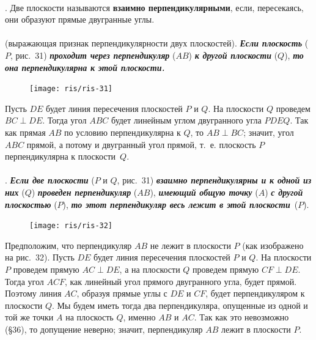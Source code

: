 \documentclass[twoside]{book}
\begin{document}
\paragraph{}\label{1938/s42}
.
Две плоскости называются \textbf{взаимно перпендикулярными}, если, пересекаясь, они образуют прямые двугранные углы.

\paragraph{}\label{1938/s43}  (выражающая признак перпендикулярности двух плоскостей).
\textbf{\emph{Если плоскость}} ($P$, рис.~31) \textbf{\emph{проходит через перпендикуляр}} ($AB$) \textbf{\emph{к другой плоскости}} ($Q$), \textbf{\emph{то она перпендикулярна к этой плоскости.}}

\begin{figure}[h!]
\centering
\texttt{[image: ris/ris-31]}
\caption{}
\end{figure}

Пусть $DE$ будет линия пересечения плоскостей $P$ и $Q$.
На плоскости $Q$ проведем $BC \perp DE$.
Тогда угол $ABC$ будет линейным углом двугранного угла $PDEQ$.
Так как прямая $AB$ по условию перпендикулярна к $Q$, то $AB\perp BC$;
значит, угол $ABC$ прямой, а потому и двугранный угол прямой, т.~е. плоскость $P$ перпендикулярна к плоскости~$Q$.

\paragraph{}\label{1938/s44}
.
\textbf{\emph{Если две плоскости}} ($P$ и $Q$, рис.~31) \textbf{\emph{взаимно перпендикулярны и к одной из них}} ($Q$) \textbf{\emph{проведен перпендикуляр}} ($AB$), \textbf{\emph{имеющий общую точку}} ($A$) \textbf{\emph{с другой плоскостью}} ($P$), \textbf{\emph{то этот перпендикуляр весь лежит в этой плоскости}}~($P$).

\begin{figure}[h!]
\centering
\texttt{[image: ris/ris-32]}
\caption{}
\end{figure}

Предположим, что перпендикуляр $AB$ не лежит в плоскости $P$ (как изображено на рис.~32).
Пусть $DE$ будет линия пересечения плоскостей $P$ и $Q$.
На плоскости $P$ проведем прямую $AC \perp DE$, а на плоскости $Q$ проведем прямую $CF \perp DE$.
Тогда угол $ACF$, как линейный угол прямого двугранного угла, будет прямой.
Поэтому линия $AC$, образуя прямые углы с $DE$ и $CF$, будет перпендикуляром к плоскости $Q$.
Мы будем иметь тогда два перпендикуляра, опущенные из одной и той же точки $A$ на плоскость $Q$, именно $AB$ и $AC$.
Так как это невозможно (§36), то допущение неверно;
значит, перпендикуляр $AB$ лежит в плоскости $P$.
\end{document}
